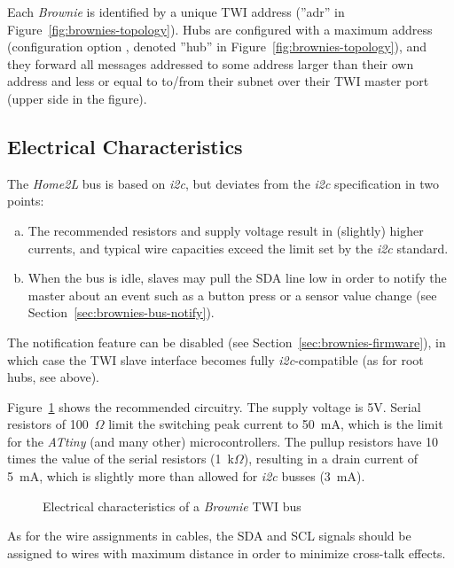 \documentclass[12pt,english,parskip=half,headheight=19pt]{scrreprt}
\newcommand{\figsvg}[2][]{}            %
\newcommand{\figsvg}[2][]{\href{#2}{}} %
\newcommand{\lst}[1]{\colorbox{lstbackground}{\footnotesize\code{#1}}}
\begin{document}
Each \textit{Brownie} is identified by a unique TWI address (''adr'' in Figure~\ref{fig:brownies-topology}). Hubs are configured with a maximum address (configuration option \lst{hub_maxadr}, denoted ''hub'' in Figure~\ref{fig:brownies-topology}), and they forward all messages addressed to some address larger than their own address and less or equal to \lst{hub_maxadr} to/from their subnet over their TWI master port (upper side in the figure).



\subsection{Electrical Characteristics}
\label{sec:brownies-bus-electrical}

The \textit{Home2L} bus is based on \textit{i2c}, but deviates from the \textit{i2c} specification in two points:
\begin{enumerate}[a)]
  \item The recommended resistors and supply voltage result in (slightly) higher currents, and typical wire capacities exceed the limit set by the \textit{i2c} standard.
  \item When the bus is idle, slaves may pull the SDA line low in order to notify the master about an event such as a button press or a sensor value change (see Section~\ref{sec:brownies-bus-notify}).
\end{enumerate}

The notification feature can be disabled (see Section~\ref{sec:brownies-firmware}), in which case the TWI slave interface becomes fully \textit{i2c}-compatible (as for root hubs, see above).

Figure~\ref{fig:brownies-electrical} shows the recommended circuitry. The supply voltage is 5V. Serial resistors of 100~$\Omega$ limit the switching peak current to 50~mA, which is the limit for the \textit{ATtiny} (and many other) microcontrollers. The pullup resistors have 10 times the value of the serial resistors (1~k$\Omega$), resulting in a drain current of 5~mA, which is slightly more than allowed for \textit{i2c} busses (3~mA).

\begin{figure}[ht]
  \centering
  \figsvg{figs/brownies-electrical.svg}
  \caption[l]{Electrical characteristics of a \textit{Brownie} TWI bus}
  \label{fig:brownies-electrical}
\end{figure}

As for the wire assignments in cables, the SDA and SCL signals should be assigned to wires with maximum distance in order to minimize cross-talk effects.
\end{document}
